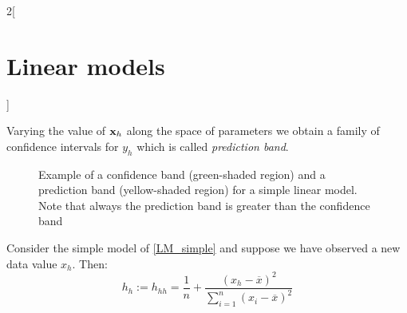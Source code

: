 \documentclass[../../../main_math.tex]{subfiles}
\begin{document}
\begin{multicols}{2}[\section{Linear models}]
\begin{proposition}
\begin{enumerate}
    \end{enumerate}
    Varying the value of $\boldsymbol{\mathrm{x}}_h$ along the space of parameters we obtain a family of confidence intervals for $y_h$ which is called \emph{prediction band}.
  \end{proposition}
  \begin{figure}[H]
    \centering
    
    \caption{Example of a confidence band (green-shaded region) and a prediction band (yellow-shaded region) for a simple linear model. Note that always the prediction band is greater than the confidence band}
  \end{figure}
  \begin{corollary}
    Consider the simple model of \cref{LM_simple} and suppose we have observed a new data value $x_h$. Then: $$h_{h}:=h_{hh}=\frac{1}{n}+\frac{{(x_h-\overline{x})}^2}{\sum_{i=1}^n{(x_i-\overline{x})}^2}$$
  \end{corollary}

\end{multicols}
\end{document}
